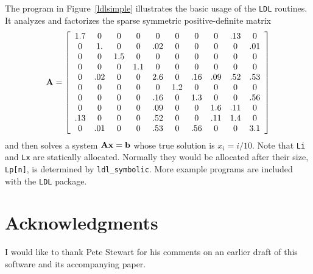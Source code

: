\documentclass[12pt]{article}
\newcommand{\m}[1]{{\bf{#1}}}       %
\begin{document}
The program in Figure~\ref{ldlsimple}
illustrates the basic usage of the {\tt LDL} routines.
It analyzes and factorizes the sparse symmetric positive-definite matrix
{\small
\[
\m{A} = \left[
\begin{array}{cccccccccc}
      1.7 &   0 &   0 &   0 &   0 &   0 &   0 &   0 & .13 &   0 \\
        0 &  1. &   0 &   0 & .02 &   0 &   0 &   0 &   0 & .01 \\
        0 &   0 & 1.5 &   0 &   0 &   0 &   0 &   0 &   0 &   0 \\
        0 &   0 &   0 & 1.1 &   0 &   0 &   0 &   0 &   0 &   0 \\
        0 & .02 &   0 &   0 & 2.6 &   0 & .16 & .09 & .52 & .53 \\
        0 &   0 &   0 &   0 &   0 & 1.2 &   0 &   0 &   0 &   0 \\
        0 &   0 &   0 &   0 & .16 &   0 & 1.3 &   0 &   0 & .56 \\
        0 &   0 &   0 &   0 & .09 &   0 &   0 & 1.6 & .11 &   0 \\
      .13 &   0 &   0 &   0 & .52 &   0 &   0 & .11 & 1.4 &   0 \\
        0 & .01 &   0 &   0 & .53 &   0 & .56 &   0 &   0 & 3.1 \\
\end{array}
\right]
\]
}
and then solves a system $\m{Ax}=\m{b}$ whose true solution is
$x_i = i/10$.  Note that {\tt Li} and {\tt Lx} are statically allocated.
Normally they would be allocated after their size, {\tt Lp[n]},
is determined by {\tt ldl\_symbolic}.
More example programs are included with the {\tt LDL} package.

\section{Acknowledgments}

I would like to thank Pete Stewart for his comments on an earlier draft
of this software and its accompanying paper.

\newpage


\end{document}
